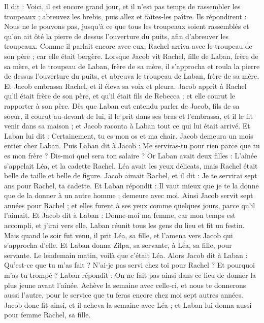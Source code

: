 \begin{multicols}{2}
Il dit : Voici, il est encore grand jour, et il n'est pas temps de rassembler les troupeaux ; abreuvez les brebis, puis allez et faites-les paître.
Ils répondirent : Nous ne le pouvons pas, jusqu'à ce que tous les troupeaux soient rassemblés et qu'on ait ôté la pierre de dessus l'ouverture du puits, afin d'abreuver les troupeaux.
Comme il parlait encore avec eux, Rachel arriva avec le troupeau de son père ; car elle était bergère.
Lorsque Jacob vit Rachel, fille de Laban, frère de sa mère, et le troupeau de Laban, frère de sa mère, il s'approcha et roula la pierre de dessus l'ouverture du puits, et abreuva le troupeau de Laban, frère de sa mère.
Et Jacob embrassa Rachel, et il éleva sa voix et pleura.
Jacob apprit à Rachel qu'il était frère de son père, et qu'il était fils de Rebecca ; et elle courut le rapporter à son père.
Dès que Laban eut entendu parler de Jacob, fils de sa soeur, il courut au-devant de lui, il le prit dans ses bras et l’embrassa, et il le fit venir dans sa maison ; et Jacob raconta à Laban tout ce qui lui était arrivé.
Et Laban lui dit : Certainement, tu es mon os et ma chair. Jacob demeura un mois entier chez Laban.
Puis Laban dit à Jacob : Me serviras-tu pour rien parce que tu es mon frère ? Dis-moi quel sera ton salaire ?
Or Laban avait deux filles : L'aînée s'appelait Léa, et la cadette Rachel.
Léa avait les yeux délicats, mais Rachel était belle de taille et belle de figure.
Jacob aimait Rachel, et il dit : Je te servirai sept ans pour Rachel, ta cadette.
Et Laban répondit : Il vaut mieux que je te la donne que de la donner à un autre homme ; demeure avec moi.
Ainsi Jacob servit sept années pour Rachel ; et elles furent à ses yeux comme quelques jours, parce qu'il l'aimait.
Et Jacob dit à Laban : Donne-moi ma femme, car mon temps est accompli, et j’irai vers elle.
Laban réunit tous les gens du lieu et fit un festin.
Mais quand le soir fut venu, il prit Léa, sa fille, et l'amena vers Jacob qui s’approcha d’elle.
Et Laban donna Zilpa, sa servante, à Léa, sa fille, pour servante.
Le lendemain matin, voilà que c'était Léa. Alors Jacob dit à Laban : Qu'est-ce que tu m'as fait ? N'ai-je pas servi chez toi pour Rachel ? Et pourquoi m'as-tu trompé ?
Laban répondit : On ne fait pas ainsi dans ce lieu de donner la plus jeune avant l'aînée.
Achève la semaine avec celle-ci, et nous te donnerons aussi l'autre, pour le service que tu feras encore chez moi sept autres années.
Jacob donc fit ainsi, et il acheva la semaine avec Léa ; et Laban lui donna aussi pour femme Rachel, sa fille.

\end{multicols}
